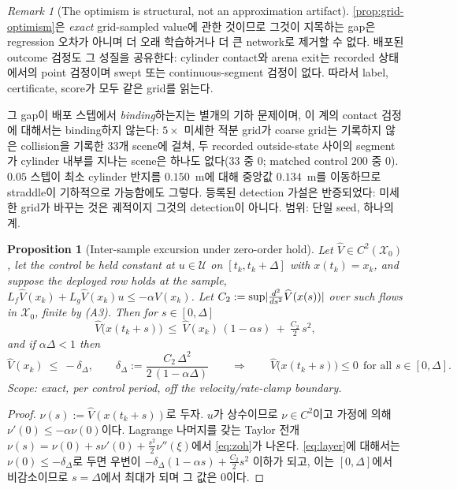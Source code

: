 \documentclass[11pt]{article}
\theoremstyle{plain}
\newtheorem{proposition}[theorem]{Proposition}
\theoremstyle{definition}
\theoremstyle{remark}
\newtheorem{remark}[theorem]{Remark}
\DeclarePairedDelimiter{\abs}{\lvert}{\rvert}
\newcommand{\calX}{\mathcal{X}}
\newcommand{\calU}{\mathcal{U}}
\newcommand{\Vhat}{\widehat V}
\newcommand{\Lg}{L_g}
\newcommand{\Lf}{L_f}
\newcommand{\eqdef}{:=}
\begin{document}
\begin{remark}[The optimism is structural, not an approximation artifact]\label{rem:grid-structural}
\cref{prop:grid-optimism}은 \emph{exact} grid-sampled value에 관한 것이므로 그것이 지목하는 gap은
regression 오차가 아니며 더 오래 학습하거나 더 큰 network로 제거할 수 없다. 배포된 outcome 검정도
그 성질을 공유한다: cylinder contact와 arena exit는 recorded 상태에서의 point 검정이며 swept 또는
continuous-segment 검정이 없다. 따라서 label, certificate, score가 모두 같은 grid를 읽는다.

그 gap이 배포 스텝에서 \emph{binding}하는지는 별개의 기하 문제이며, 이 계의 contact 검정에
대해서는 binding하지 않는다: $5\times$ 미세한 적분 grid가 coarse grid는 기록하지 않은 collision을
기록한 $33$개 scene에 걸쳐, 두 recorded outside-state 사이의 segment가 cylinder 내부를 지나는
scene은 하나도 없다($33$ 중 $0$; matched control $200$ 중 $0$). $0.05$ 스텝이 최소 cylinder 반지름
$0.150$~m에 대해 중앙값 $0.134$~m를 이동하므로 straddle이 기하적으로 가능함에도 그렇다. 등록된
detection 가설은 반증되었다: 미세한 grid가 바꾸는 것은 궤적이지 그것의 detection이 아니다. 범위:
단일 seed, 하나의 계.
\end{remark}

\begin{proposition}[Inter-sample excursion under zero-order hold]\label{prop:zoh-layer}
Let $\Vhat\in C^2(\calX_0)$, let the control be held constant at $u\in\calU$ on
$[t_k,t_k+\Delta]$ with $x(t_k)=x_k$, and suppose the deployed row holds at the sample,
$\Lf\Vhat(x_k)+\Lg\Vhat(x_k)u\le-\alpha\Vhat(x_k)$. Let
$C_2\eqdef\sup\abs{\tfrac{d^2}{ds^2}\Vhat(x(s))}$ over such flows in $\calX_0$, finite by (A3).
Then for $s\in[0,\Delta]$
\begin{equation}\label{eq:zoh}
\Vhat\big(x(t_k+s)\big)\ \le\ \Vhat(x_k)\,(1-\alpha s)\ +\ \tfrac{C_2}{2}\,s^2 ,
\end{equation}
and if $\alpha\Delta<1$ then
\begin{equation}\label{eq:layer}
\Vhat(x_k)\ \le\ -\delta_\Delta,\qquad
\delta_\Delta\eqdef\frac{C_2\,\Delta^2}{2\,(1-\alpha\Delta)}
\qquad\Longrightarrow\qquad
\Vhat\big(x(t_k+s)\big)\le0\ \ \text{for all }s\in[0,\Delta].
\end{equation}
Scope: exact, per control period, off the velocity/rate-clamp boundary.
\end{proposition}
\begin{proof}
$\nu(s)\eqdef\Vhat(x(t_k+s))$로 두자. $u$가 상수이므로 $\nu\in C^2$이고 가정에 의해
$\nu'(0)\le-\alpha\nu(0)$이다. Lagrange 나머지를 갖는 Taylor 전개
$\nu(s)=\nu(0)+s\nu'(0)+\tfrac{s^2}{2}\nu''(\xi)$에서 \cref{eq:zoh}가 나온다. \cref{eq:layer}에
대해서는 $\nu(0)\le-\delta_\Delta$로 두면 우변이 $-\delta_\Delta(1-\alpha s)+\tfrac{C_2}{2}s^2$
이하가 되고, 이는 $[0,\Delta]$에서 비감소이므로 $s=\Delta$에서 최대가 되며 그 값은 $0$이다.
\end{proof}
\end{document}

